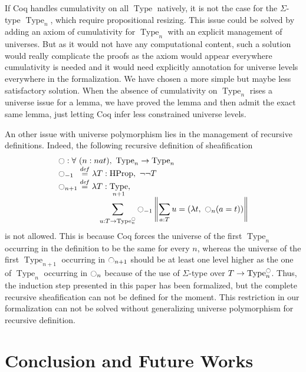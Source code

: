 \documentclass[conference]{IEEEtran}
\newcommand \defeq {\overset{de\hspace{-0.2ex}f}{=}}
\newcommand{\mynote}[2]{
    \fbox{\bfseries\sffamily\scriptsize#1}
    {\small$\blacktriangleright$\textsf{\emph{#2}}$\blacktriangleleft$}~}
\newcommand\nt[1]{\mynote{NT}{#1}}
\DeclareMathOperator{\Type}{Type}
\DeclareMathOperator{\HProp}{HProp}
\newcommand{\modal}{\ensuremath{\ocircle}}
\begin{document}
%
If Coq handles cumulativity on all $\Type$ natively, it is not
the case for the $\Sigma$-type $\Type_n$, which require propositional
resizing. 
%
This issue could be solved by adding an axiom of cumulativity
for $\Type_n$ with an explicit management of universes. 
%
But as it would not have any computational content, such a solution
would really complicate the proofs as the axiom would appear
everywhere cumulativity is needed and it would need explicitly
annotation for universe levels everywhere in the formalization.
%
We have chosen a more simple but maybe less satisfactory solution. 
%
When the absence of cumulativity on $\Type_n$ rises a universe issue
for a lemma, we have proved the lemma and then admit the exact same
lemma, just letting Coq infer less constrained universe levels.

An other issue with universe polymorphism lies in the management of
recursive definitions. Indeed, the following recursive definition of
sheafification
%
\[ \begin{array}{l}
   \modal : \forall \ (n : nat), \ \Type_n \to \Type_n 
   \\
    \modal_{-1\phantom{n}} \defeq \lambda T:\HProp,~ \lnot\lnot T \\
      \displaystyle{\modal_{n+1} \defeq  \lambda T:\Type_{n+1}},\\
      \hspace{5em} \displaystyle{\sum_{u:T \to \Type_n^\modal} \modal_{-1} 
      \left\|
      \sum_{a:T} u= (\lambda t,~\modal_n (a=t))
      \right\|}
    \end{array}
\]
%
is not allowed. 
%
This is because Coq forces the universe of the first $\Type_n$
occurring in the definition to be the same for every $n$, whereas the
universe of the first $\Type_{n+1}$ occurring in $\modal_{n+1}$ should be at
least one level higher as the one of $\Type_n$ occurring in
$\modal_{n}$ because of the use of $\Sigma$-type over
$T \to \Type_n^\modal$.
%
%
Thus, the induction step presented in this paper has been formalized,
but the complete recursive sheafification can not be defined for the
moment.
%
This restriction in our formalization can not be solved without
generalizing universe polymorphism for recursive definition.
%


\section{Conclusion and Future Works}
\label{sec:future-works}
\end{document}
